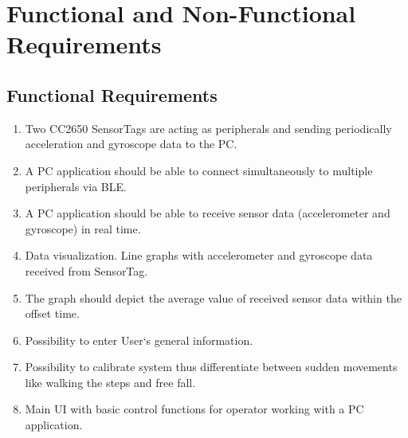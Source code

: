 \documentclass[conference,12pt]{IEEETran}
\begin{document}
\section{Functional and Non-Functional Requirements}
\subsection{Functional Requirements}
\begin{enumerate}
	\item Two CC2650 SensorTags are acting as peripherals and sending periodically acceleration and gyroscope data to the PC.
	\item A PC application should be able to connect simultaneously to multiple peripherals via BLE.
	\item A PC application should be able to receive sensor data (accelerometer and gyroscope) in real time.
	\item Data visualization. Line graphs with accelerometer and gyroscope data received from SensorTag.
	\item The graph should depict the average value of received sensor data within the offset time.
	\item Possibility to enter User‘s general information.
	\item Possibility to calibrate system thus differentiate between sudden movements like walking the steps and free fall.
	\item Main UI with basic control functions for operator working with a PC application.		
\end{enumerate}
\end{document}
